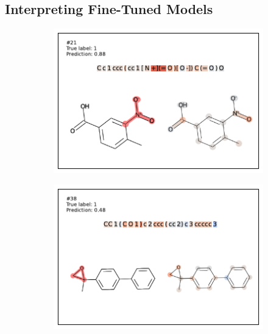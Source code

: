 \documentclass{article} %
\begin{document}
\subsection{Interpreting Fine-Tuned Models}\label{sec:captum}
\begin{figure}[h]
    \centering
    \begin{subfigure}[b]{0.35\textwidth} 
      \centering 
      \includegraphics[width=\textwidth]{figures/ames/ames21.pdf} 
    \end{subfigure}\begin{subfigure}[b]{0.35\textwidth} 
      \centering 
      \includegraphics[width=\textwidth]{figures/ames/ames38.pdf} 
    \end{subfigure}
    \begin{subfigure}[b]{0.35\textwidth} 
      \centering 

\end{subfigure}
\end{figure}
\end{document}
